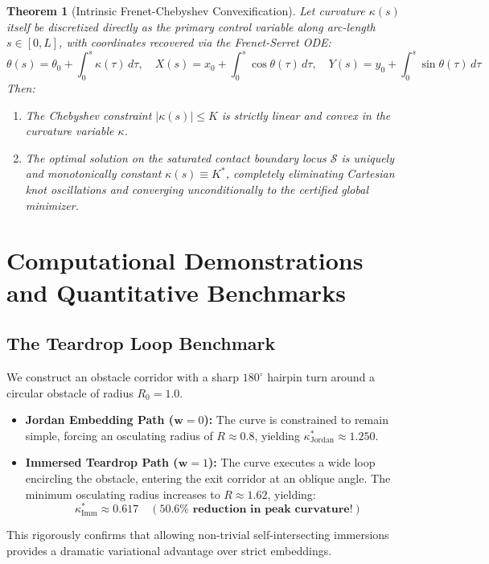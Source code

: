 \documentclass[11pt,reqno]{amsart}
\newtheorem{theorem}{Theorem}[section]
\theoremstyle{definition}
\numberwithin{equation}{section}
\begin{document}
\begin{theorem}[Intrinsic Frenet-Chebyshev Convexification]
\label{thm:frenet_convexification}
Let curvature $\kappa(s)$ itself be discretized directly as the primary control variable along arc-length $s \in [0, L]$, with coordinates recovered via the Frenet-Serret ODE:
\begin{equation}
\theta(s) = \theta_0 + \int_0^s \kappa(\tau) \, d\tau, \quad X(s) = x_0 + \int_0^s \cos\theta(\tau) \, d\tau, \quad Y(s) = y_0 + \int_0^s \sin\theta(\tau) \, d\tau
\end{equation}
Then:
\begin{enumerate}
    \item The Chebyshev constraint $|\kappa(s)| \le K$ is strictly linear and convex in the curvature variable $\kappa$.
    \item The optimal solution on the saturated contact boundary locus $\mathcal{S}$ is uniquely and monotonically constant $\kappa(s) \equiv K^*$, completely eliminating Cartesian knot oscillations and converging unconditionally to the certified global minimizer.
\end{enumerate}
\end{theorem}

\section{Computational Demonstrations and Quantitative Benchmarks}

\subsection{The Teardrop Loop Benchmark}
We construct an obstacle corridor with a sharp $180^\circ$ hairpin turn around a circular obstacle of radius $R_0 = 1.0$. 
\begin{itemize}
    \item \textbf{Jordan Embedding Path ($\mathbf{w} = 0$):} The curve is constrained to remain simple, forcing an osculating radius of $R \approx 0.8$, yielding $\kappa^*_{\mathrm{Jordan}} \approx 1.250$.
    \item \textbf{Immersed Teardrop Path ($\mathbf{w} = 1$):} The curve executes a wide loop encircling the obstacle, entering the exit corridor at an oblique angle. The minimum osculating radius increases to $R \approx 1.62$, yielding:
    \begin{equation}
    \kappa^*_{\mathrm{Imm}} \approx 0.617 \quad (\mathbf{50.6\% \text{ reduction in peak curvature!}})
    \end{equation}
\end{itemize}
This rigorously confirms that allowing non-trivial self-intersecting immersions provides a dramatic variational advantage over strict embeddings.
\end{document}
